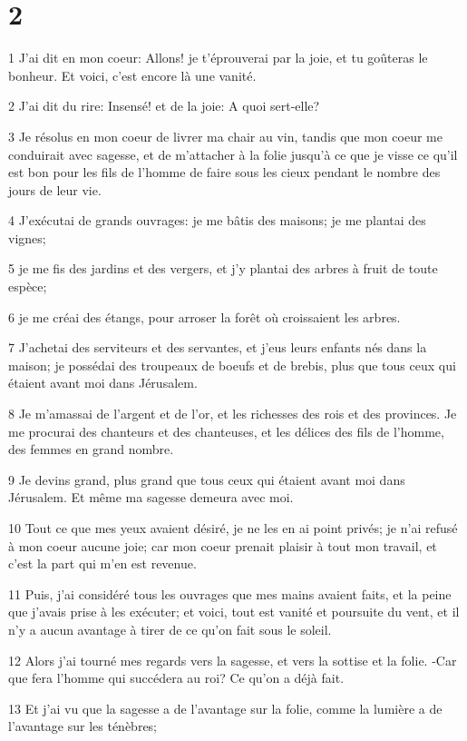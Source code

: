 \chapter{2}

\par 1 J'ai dit en mon coeur: Allons! je t'éprouverai par la joie, et tu goûteras le bonheur. Et voici, c'est encore là une vanité.
\par 2 J'ai dit du rire: Insensé! et de la joie: A quoi sert-elle?
\par 3 Je résolus en mon coeur de livrer ma chair au vin, tandis que mon coeur me conduirait avec sagesse, et de m'attacher à la folie jusqu'à ce que je visse ce qu'il est bon pour les fils de l'homme de faire sous les cieux pendant le nombre des jours de leur vie.
\par 4 J'exécutai de grands ouvrages: je me bâtis des maisons; je me plantai des vignes;
\par 5 je me fis des jardins et des vergers, et j'y plantai des arbres à fruit de toute espèce;
\par 6 je me créai des étangs, pour arroser la forêt où croissaient les arbres.
\par 7 J'achetai des serviteurs et des servantes, et j'eus leurs enfants nés dans la maison; je possédai des troupeaux de boeufs et de brebis, plus que tous ceux qui étaient avant moi dans Jérusalem.
\par 8 Je m'amassai de l'argent et de l'or, et les richesses des rois et des provinces. Je me procurai des chanteurs et des chanteuses, et les délices des fils de l'homme, des femmes en grand nombre.
\par 9 Je devins grand, plus grand que tous ceux qui étaient avant moi dans Jérusalem. Et même ma sagesse demeura avec moi.
\par 10 Tout ce que mes yeux avaient désiré, je ne les en ai point privés; je n'ai refusé à mon coeur aucune joie; car mon coeur prenait plaisir à tout mon travail, et c'est la part qui m'en est revenue.
\par 11 Puis, j'ai considéré tous les ouvrages que mes mains avaient faits, et la peine que j'avais prise à les exécuter; et voici, tout est vanité et poursuite du vent, et il n'y a aucun avantage à tirer de ce qu'on fait sous le soleil.
\par 12 Alors j'ai tourné mes regards vers la sagesse, et vers la sottise et la folie. -Car que fera l'homme qui succédera au roi? Ce qu'on a déjà fait.
\par 13 Et j'ai vu que la sagesse a de l'avantage sur la folie, comme la lumière a de l'avantage sur les ténèbres;
